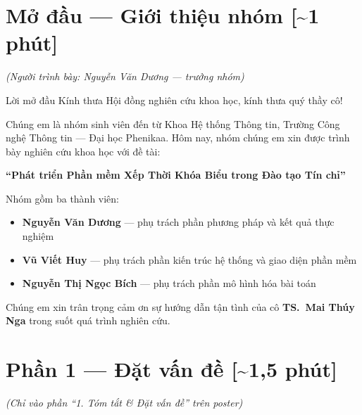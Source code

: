 \documentclass[12pt, a4paper]{article}
\begin{document}
\section{Mở đầu — Giới thiệu nhóm \hfill{\normalfont\color{MidGray}[\textasciitilde{}1 phút]}}

\textit{(Người trình bày: Nguyễn Văn Dương — trưởng nhóm)}

\begin{scriptbox}{Lời mở đầu}
Kính thưa Hội đồng nghiên cứu khoa học, kính thưa quý thầy cô!

\medskip
Chúng em là nhóm sinh viên đến từ Khoa Hệ thống Thông tin, Trường Công nghệ Thông tin --- Đại học Phenikaa. Hôm nay, nhóm chúng em xin được trình bày nghiên cứu khoa học với đề tài:

\medskip
\begin{center}
  \textbf{``Phát triển Phần mềm Xếp Thời Khóa Biểu trong Đào tạo Tín chỉ''}
\end{center}

\medskip
Nhóm gồm ba thành viên:
\begin{itemize}[leftmargin=1.5cm]
  \item \textbf{Nguyễn Văn Dương} --- phụ trách phần phương pháp và kết quả thực nghiệm
  \item \textbf{Vũ Viết Huy} --- phụ trách phần kiến trúc hệ thống và giao diện phần mềm
  \item \textbf{Nguyễn Thị Ngọc Bích} --- phụ trách phần mô hình hóa bài toán
\end{itemize}

\medskip
Chúng em xin trân trọng cảm ơn sự hướng dẫn tận tình của cô \textbf{TS.~Mai Thúy Nga} trong suốt quá trình nghiên cứu.
\end{scriptbox}

\section{Phần 1 — Đặt vấn đề \hfill{\normalfont\color{MidGray}[\textasciitilde{}1,5 phút]}}

\textit{(Chỉ vào phần ``1. Tóm tắt \& Đặt vấn đề'' trên poster)}
\end{document}
